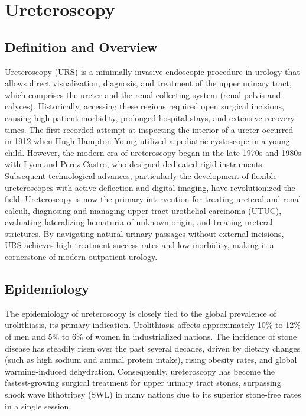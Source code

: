 \chapter{Ureteroscopy}

\section*{Definition and Overview}
Ureteroscopy (URS) is a minimally invasive endoscopic procedure in urology that allows direct visualization, diagnosis, and treatment of the upper urinary tract, which comprises the ureter and the renal collecting system (renal pelvis and calyces). Historically, accessing these regions required open surgical incisions, causing high patient morbidity, prolonged hospital stays, and extensive recovery times. The first recorded attempt at inspecting the interior of a ureter occurred in 1912 when Hugh Hampton Young utilized a pediatric cystoscope in a young child. However, the modern era of ureteroscopy began in the late 1970s and 1980s with Lyon and Perez-Castro, who designed dedicated rigid instruments. Subsequent technological advances, particularly the development of flexible ureteroscopes with active deflection and digital imaging, have revolutionized the field. Ureteroscopy is now the primary intervention for treating ureteral and renal calculi, diagnosing and managing upper tract urothelial carcinoma (UTUC), evaluating lateralizing hematuria of unknown origin, and treating ureteral strictures. By navigating natural urinary passages without external incisions, URS achieves high treatment success rates and low morbidity, making it a cornerstone of modern outpatient urology.

\section*{Epidemiology}
The epidemiology of ureteroscopy is closely tied to the global prevalence of urolithiasis, its primary indication. Urolithiasis affects approximately 10\% to 12\% of men and 5\% to 6\% of women in industrialized nations. The incidence of stone disease has steadily risen over the past several decades, driven by dietary changes (such as high sodium and animal protein intake), rising obesity rates, and global warming-induced dehydration. Consequently, ureteroscopy has become the fastest-growing surgical treatment for upper urinary tract stones, surpassing shock wave lithotripsy (SWL) in many nations due to its superior stone-free rates in a single session.

